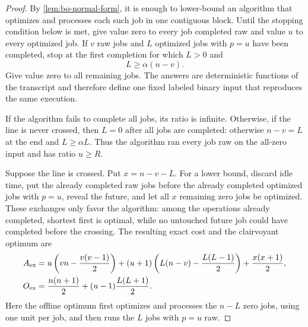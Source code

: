 \begin{proof}
By \cref{lem:bo-normal-form}, it is enough to lower-bound an algorithm that
optimizes and processes each such job in one contiguous block.  Until the
stopping condition
below is met, give value zero to every job completed raw and value $u$ to
every optimized job.
If $v$ raw jobs and $L$ optimized jobs with $p=u$ have been completed, stop at the
first completion for which $L>0$ and
\begin{equation}
 L\ge\alpha(n-v).
 \label{eq:bo-det-stopping-line}
\end{equation}
Give value zero to all remaining jobs.  The answers are deterministic
functions of the transcript and therefore define one fixed labeled binary
input that reproduces the same execution.

If the algorithm fails to complete all jobs, its ratio is infinite.  Otherwise,
if the line is never crossed, then $L=0$ after all jobs are completed:
otherwise $n-v=L$ at the end and $L\ge\alpha L$.  Thus the algorithm ran
every job raw on the all-zero input and has ratio $u\ge R$.

Suppose the line is crossed.  Put $x=n-v-L$.  For a lower bound, discard
idle time, put the already completed raw jobs before the already completed
optimized jobs with $p=u$, reveal the future, and let all $x$ remaining zero
jobs be optimized.  These exchanges only favor the algorithm: among the
operations already completed, shortest first is optimal, while no untouched
future job could
have completed before the crossing.  The resulting exact cost and the
clairvoyant optimum are
\begin{align}
 A_{\rm ex}={}&
 u\left(vn-\frac{v(v-1)}2\right)
 +(u+1)\left(L(n-v)-\frac{L(L-1)}2\right)
 +\frac{x(x+1)}2,
 \label{eq:bo-det-stopping-Aexact}\\
 O_{\rm ex}={}&
 \frac{n(n+1)}2+(u-1)\frac{L(L+1)}2.
 \label{eq:bo-det-stopping-Oexact}
\end{align}
Here the offline optimum first optimizes and processes the $n-L$ zero jobs,
using one unit per job, and then runs the $L$ jobs with $p=u$ raw.


\end{proof}
